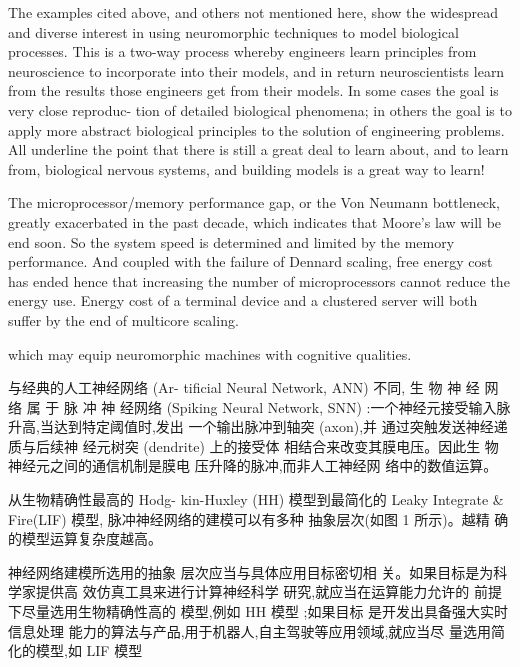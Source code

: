 The examples cited above, and others not mentioned
here, show the widespread and diverse interest in using
neuromorphic techniques to model biological processes. This
is a two-way process whereby engineers learn principles from
neuroscience to incorporate into their models, and in return
neuroscientists learn from the results those engineers get from
their models. In some cases the goal is very close reproduc-
tion of detailed biological phenomena; in others the goal is to
apply more abstract biological principles to the solution of
engineering problems. All underline the point that there is still
a great deal to learn about, and to learn from, biological
nervous systems, and building models is a great way to learn!

The microprocessor/memory performance gap, or the Von Neumann bottleneck, greatly exacerbated in the past decade, which indicates that Moore's law will be end soon.
So the system speed is determined and limited by the memory performance.
And coupled with the failure of Dennard scaling, free energy cost has ended hence that increasing the number of microprocessors cannot reduce the energy use. 
Energy cost of a terminal device and a clustered server will both suffer by the end of multicore scaling.


which may equip neuromorphic machines with cognitive qualities.

与经典的人工神经网络 (Ar-
tificial Neural Network, ANN) 不同, 生 物 神 经 网 络 属 于 脉 冲 神 经网络 (Spiking Neural Network,
SNN) :一个神经元接受输入脉
升高,当达到特定阈值时,发出
一个输出脉冲到轴突 (axon),并
通过突触发送神经递质与后续神
经元树突 (dendrite) 上的接受体
相结合来改变其膜电压。因此生
物神经元之间的通信机制是膜电
压升降的脉冲,而非人工神经网
络中的数值运算。

从生物精确性最高的 Hodg-
kin-Huxley (HH) 模型到最简化的
Leaky Integrate \& Fire(LIF) 模型,
脉冲神经网络的建模可以有多种
抽象层次(如图 1 所示)。越精
确的模型运算复杂度越高。

神经网络建模所选用的抽象
层次应当与具体应用目标密切相
关。如果目标是为科学家提供高
效仿真工具来进行计算神经科学
研究,就应当在运算能力允许的 
前提下尽量选用生物精确性高的
模型,例如 HH 模型 ;如果目标
是开发出具备强大实时信息处理
能力的算法与产品,用于机器人,自主驾驶等应用领域,就应当尽
量选用简化的模型,如 LIF 模型

